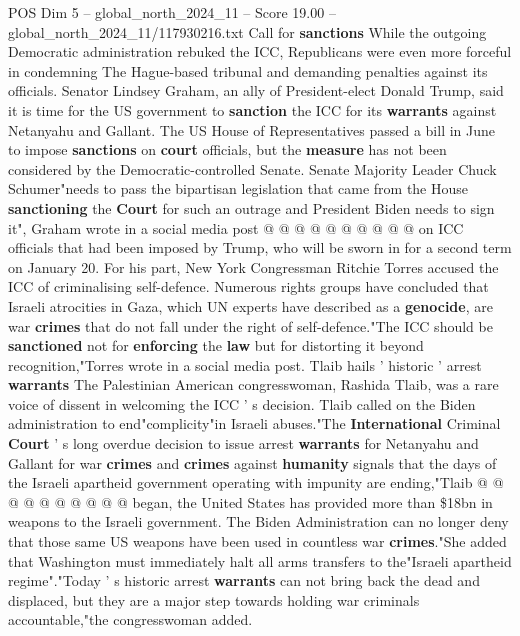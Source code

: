 \begin{textsample}{POS Dim 5 – global\_north\_2024\_11 – Score 19.00 – global\_north\_2024\_11/117930216.txt}
Call for \textbf{sanctions} While the outgoing Democratic administration rebuked the ICC, Republicans were even more forceful in condemning The Hague-based tribunal and demanding penalties against its officials.
Senator Lindsey Graham, an ally of President-elect Donald Trump, said it is time for the US government to \textbf{sanction} the ICC for its \textbf{warrants} against Netanyahu and Gallant.
The US House of Representatives passed a bill in June to impose \textbf{sanctions} on \textbf{court} officials, but the \textbf{measure} has not been considered by the Democratic-controlled Senate.
Senate Majority Leader Chuck Schumer"needs to pass the bipartisan legislation that came from the House \textbf{sanctioning} the \textbf{Court} for such an outrage and President Biden needs to sign it", Graham wrote in a social media post @ @ @ @ @ @ @ @ @ @ on ICC officials that had been imposed by Trump, who will be sworn in for a second term on January 20.
For his part, New York Congressman Ritchie Torres accused the ICC of criminalising self-defence.
Numerous rights groups have concluded that Israeli atrocities in Gaza, which UN experts have described as a \textbf{genocide}, are war \textbf{crimes} that do not fall under the right of self-defence."The ICC should be \textbf{sanctioned} not for \textbf{enforcing} the \textbf{law} but for distorting it beyond recognition,"Torres wrote in a social media post.
Tlaib hails ' historic ' arrest \textbf{warrants} The Palestinian American congresswoman, Rashida Tlaib, was a rare voice of dissent in welcoming the ICC ' s decision.
Tlaib called on the Biden administration to end"complicity"in Israeli abuses."The \textbf{International} Criminal \textbf{Court} ' s long overdue decision to issue arrest \textbf{warrants} for Netanyahu and Gallant for war \textbf{crimes} and \textbf{crimes} against \textbf{humanity} signals that the days of the Israeli apartheid government operating with impunity are ending,"Tlaib @ @ @ @ @ @ @ @ @ @ began, the United States has provided more than \$18bn in weapons to the Israeli government.
The Biden Administration can no longer deny that those same US weapons have been used in countless war \textbf{crimes}."She added that Washington must immediately halt all arms transfers to the"Israeli apartheid regime"."Today ' s historic arrest \textbf{warrants} can not bring back the dead and displaced, but they are a major step towards holding war criminals accountable,"the congresswoman added.

\end{textsample}
